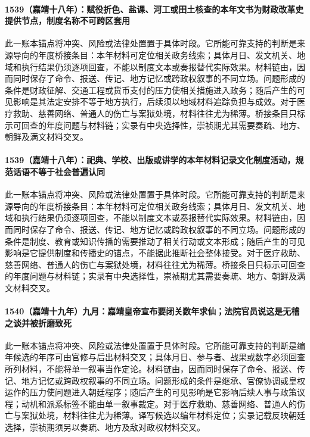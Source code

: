 \paragraph{1539（嘉靖十八年）：赋役折色、盐课、河工或田土核查的本年文书为财政改革史提供节点，制度名称不可跨区套用} 此一账本锚点将冲突、风险或法律处置置于具体时段。它所能可靠支持的判断是来源导向的年度桥接条目：本年材料可定位相关政务线索；具体月日、发文机关、地域和执行结果仍须逐项回查，不能以制度文本或奏报替代实际效果。材料链由，因而同时保存了命令、报送、传记、地方记忆或跨政权叙事的不同立场。问题形成的条件是财政征解、交通工程或货币支付的压力使相关措施进入政务；随后产生的可见影响是其法定安排不等于地方执行，后续须以地域材料追踪负担与成效。对于医疗救助、慈善网络、普通人的伤亡与案狱处境，材料往往尤为稀薄。桥接条目只标示可回查的年度问题与材料链；实录有中央选择性，崇祯期尤其需要奏疏、地方、朝鲜及满文材料交叉。

\paragraph{1539（嘉靖十八年）：祀典、学校、出版或讲学的本年材料记录文化制度活动，规范话语不等于社会普遍认同} 此一账本锚点将冲突、风险或法律处置置于具体时段。它所能可靠支持的判断是来源导向的年度桥接条目：本年材料可定位相关政务线索；具体月日、发文机关、地域和执行结果仍须逐项回查，不能以制度文本或奏报替代实际效果。材料链由，因而同时保存了命令、报送、传记、地方记忆或跨政权叙事的不同立场。问题形成的条件是制度、教育或知识传播的需要推动了相关行动或文本形成；随后产生的可见影响是它提供制度和传播史的锚点，不能据此推断社会整体接受。对于医疗救助、慈善网络、普通人的伤亡与案狱处境，材料往往尤为稀薄。桥接条目只标示可回查的年度问题与材料链；实录有中央选择性，崇祯期尤其需要奏疏、地方、朝鲜及满文材料交叉。

\paragraph{1540（嘉靖十九年）九月：嘉靖皇帝宣布要闭关数年求仙；法院官员说这是无稽之谈并被折磨致死} 此一账本锚点将冲突、风险或法律处置置于具体时段。它所能可靠支持的判断是编年候选的年序可由官修与后出材料交叉；具体月日、参与者、战果或数字必须回查所列材料，不能将单一叙事当作定论。材料链由，因而同时保存了命令、报送、传记、地方记忆或跨政权叙事的不同立场。问题形成的条件是继承、官僚协调或皇权运作的压力使问题进入朝廷程序；随后产生的可见影响是它影响后续人事与政策议程；动机和派系标签不能由单一叙事裁定。对于医疗救助、慈善网络、普通人的伤亡与案狱处境，材料往往尤为稀薄。译写候选以编年材料定位；实录记载反映朝廷选择，崇祯期须另以奏疏、地方及敌对政权材料交叉。

